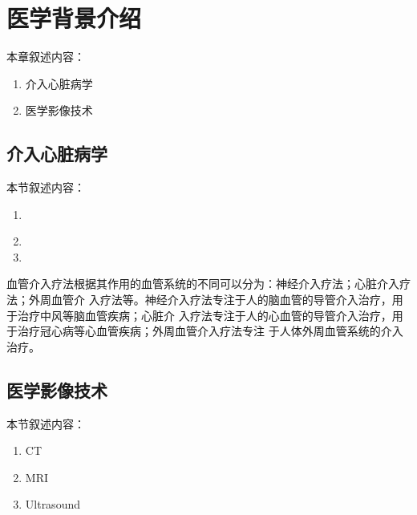 \chapter{医学背景介绍}
\label{chap2}

本章叙述内容：
\begin{enumerate}
  \item 介入心脏病学
  \item 医学影像技术
\end{enumerate}

\section{介入心脏病学}

本节叙述内容：
\begin{enumerate}
  \item　
  \item
  \item
\end{enumerate}

血管介入疗法根据其作用的血管系统的不同可以分为：神经介入疗法；心脏介入疗法；外周血管介
入疗法等。神经介入疗法专注于人的脑血管的导管介入治疗，用于治疗中风等脑血管疾病；心脏介
入疗法专注于人的心血管的导管介入治疗，用于治疗冠心病等心血管疾病；外周血管介入疗法专注
于人体外周血管系统的介入治疗\cite{coles2011}。

\section{医学影像技术}

本节叙述内容：
\begin{enumerate}
  \item CT
  \item MRI
  \item Ultrasound
\end{enumerate}
